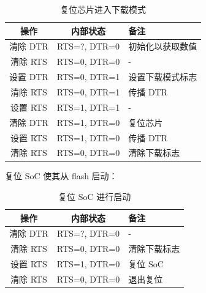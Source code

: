 \documentclass[main\_\_CN.tex]{subfiles}
\begin{document}
\begin{table}[H]
    \centering
    \caption{复位芯片进入下载模式}
    \label{tab:usbserialjtag-reset-soc-into-download-mode}
    \begin{tabular} {|c|c|l|}
    \hline
        \rowcolor{lightgray}
        \textbf{操作} & \textbf{内部状态} & \textbf{备注} \\\hline
        
        清除 DTR & RTS=?, DTR=0 & 初始化以获取数值 \\\hline
        清除 RTS & RTS=0, DTR=0 & - \\\hline
        设置 DTR & RTS=0, DTR=1 & 设置下载模式标志 \\\hline
        清除 RTS & RTS=0, DTR=1 & 传播 DTR \\\hline
        设置 RTS & RTS=1, DTR=1 & - \\\hline
        清除 DTR & RTS=1, DTR=0 & 复位芯片 \\\hline
        设置 RTS & RTS=1, DTR=0 & 传播 DTR \\\hline
        清除 RTS & RTS=0, DTR=0 & 清除下载标志\\\hline
    \end{tabular}
\end{table}

复位 SoC 使其从 flash 启动：

\begin{table}[H]
    \centering
    \caption{复位 SoC 进行启动}
    \label{tab:usbserialjtag-reset-soc-into-booting}
    \begin{tabular} {|c|c|l|}
    \hline
        \rowcolor{lightgray}
        \textbf{操作} & \textbf{内部状态} & \textbf{备注} \\\hline
        
        清除 DTR & RTS=?, DTR=0 & - \\\hline
        清除 RTS & RTS=0, DTR=0 &  清除下载标志 \\\hline
        设置 RTS & RTS=1, DTR=0 &  复位 SoC \\\hline
        清除 RTS & RTS=0, DTR=0 & 退出复位 \\\hline
    \end{tabular}
\end{table}




\end{document}
